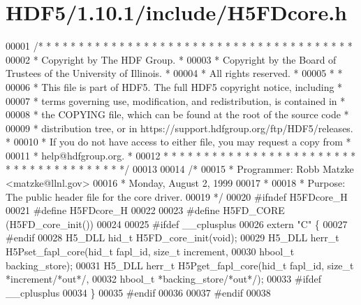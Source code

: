 \hypertarget{_h_d_f5_21_810_81_2include_2_h5_f_dcore_8h_source}{}\section{H\+D\+F5/1.10.1/include/\+H5\+F\+Dcore.h}
\label{_h_d_f5_21_810_81_2include_2_h5_f_dcore_8h_source}

\begin{DoxyCode}
00001 \textcolor{comment}{/* * * * * * * * * * * * * * * * * * * * * * * * * * * * * * * * * * * * * * *}
00002 \textcolor{comment}{ * Copyright by The HDF Group.                                               *}
00003 \textcolor{comment}{ * Copyright by the Board of Trustees of the University of Illinois.         *}
00004 \textcolor{comment}{ * All rights reserved.                                                      *}
00005 \textcolor{comment}{ *                                                                           *}
00006 \textcolor{comment}{ * This file is part of HDF5.  The full HDF5 copyright notice, including     *}
00007 \textcolor{comment}{ * terms governing use, modification, and redistribution, is contained in    *}
00008 \textcolor{comment}{ * the COPYING file, which can be found at the root of the source code       *}
00009 \textcolor{comment}{ * distribution tree, or in https://support.hdfgroup.org/ftp/HDF5/releases.  *}
00010 \textcolor{comment}{ * If you do not have access to either file, you may request a copy from     *}
00011 \textcolor{comment}{ * help@hdfgroup.org.                                                        *}
00012 \textcolor{comment}{ * * * * * * * * * * * * * * * * * * * * * * * * * * * * * * * * * * * * * * */}
00013 
00014 \textcolor{comment}{/*}
00015 \textcolor{comment}{ * Programmer:  Robb Matzke <matzke@llnl.gov>}
00016 \textcolor{comment}{ *              Monday, August  2, 1999}
00017 \textcolor{comment}{ *}
00018 \textcolor{comment}{ * Purpose: The public header file for the core driver.}
00019 \textcolor{comment}{ */}
00020 \textcolor{preprocessor}{#ifndef H5FDcore\_H}
00021 \textcolor{preprocessor}{#define H5FDcore\_H}
00022 
00023 \textcolor{preprocessor}{#define H5FD\_CORE   (H5FD\_core\_init())}
00024 
00025 \textcolor{preprocessor}{#ifdef \_\_cplusplus}
00026 \textcolor{keyword}{extern} \textcolor{stringliteral}{"C"} \{
00027 \textcolor{preprocessor}{#endif}
00028 H5\_DLL hid\_t H5FD\_core\_init(\textcolor{keywordtype}{void});
00029 H5\_DLL herr\_t H5Pset\_fapl\_core(hid\_t fapl\_id, \textcolor{keywordtype}{size\_t} increment,
00030                 hbool\_t backing\_store);
00031 H5\_DLL herr\_t H5Pget\_fapl\_core(hid\_t fapl\_id, \textcolor{keywordtype}{size\_t} *increment\textcolor{comment}{/*out*/},
00032                 hbool\_t *backing\_store\textcolor{comment}{/*out*/});
00033 \textcolor{preprocessor}{#ifdef \_\_cplusplus}
00034 \}
00035 \textcolor{preprocessor}{#endif}
00036 
00037 \textcolor{preprocessor}{#endif}
00038 
\end{DoxyCode}
